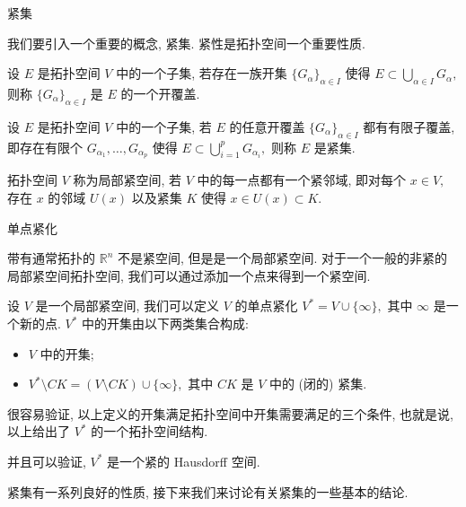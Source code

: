 \begin{frame}{紧集}

我们要引入一个重要的概念, 紧集. 紧性是拓扑空间一个重要性质.

\pause
\vspace{1em}

\begin{Def}[开覆盖]
设 $E$ 是拓扑空间 $V$ 中的一个子集, 若存在一族开集 $\{ G_{\alpha} \}_{\alpha \in I}$ 使得 $E \subset \bigcup\limits_{\alpha \in I} G_{\alpha},$ 则称 $\{ G_{\alpha} \}_{\alpha \in I}$ 是 $E$ 的一个开覆盖.
\end{Def}

\pause

\begin{Def}[紧集]
设 $E$ 是拓扑空间 $V$ 中的一个子集, 若 $E$ 的任意开覆盖 $\{ G_{\alpha} \}_{\alpha \in I}$ 都有有限子覆盖, 即存在有限个 $G_{\alpha_1}, \dots, G_{\alpha_p}$ 使得 $E \subset \bigcup\limits_{i=1}^p G_{\alpha_i},$ 则称 $E$ 是紧集.
\end{Def}

\pause

\begin{Def}[局部紧空间]
拓扑空间 $V$ 称为局部紧空间, 若 $V$ 中的每一点都有一个紧邻域, 即对每个 $x \in V,$ 存在 $x$ 的邻域 $U(x)$ 以及紧集 $K$ 使得 $x \in U(x) \subset K.$
\end{Def}

\end{frame}


\graymode
\begin{frame}{单点紧化}

带有通常拓扑的 $\mathbb{R}^n$ 不是紧空间, 但是是一个局部紧空间. 对于一个一般的非紧的局部紧空间拓扑空间, 我们可以通过添加一个点来得到一个紧空间.

\pause
\vspace{1em}

设 $V$ 是一个局部紧空间, 我们可以定义 $V$ 的单点紧化 $V^* = V \cup \{ \infty \},$ 其中 $\infty$ 是一个新的点.
$V^*$ 中的开集由以下两类集合构成:

\begin{itemize}
\item $V$ 中的开集;
\item $V^* \setminus CK = (V \setminus CK) \cup \{ \infty \},$ 其中 $CK$ 是 $V$ 中的 (闭的) 紧集.
\end{itemize}

\pause
\vspace{1em}

很容易验证, 以上定义的开集满足拓扑空间中开集需要满足的三个条件, 也就是说, 以上给出了 $V^*$ 的一个拓扑空间结构.

并且可以验证, $V^*$ 是一个紧的 Hausdorff 空间.

\pause
\vspace{1em}

紧集有一系列良好的性质, 接下来我们来讨论有关紧集的一些基本的结论.


\end{frame}
\normalmode

